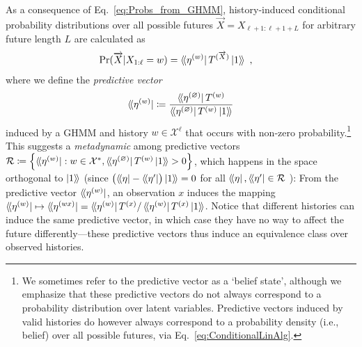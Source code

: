 \documentclass[prx,nofootinbib,onecolumn,showkeys,groupaddress,preprintnumbers,floatfix,
superscriptaddress]{revtex4-1}
\newcommand{\dbra}[1]{\bra{ \! \langle #1}}
\newcommand{\dket}[1]{\ket{ #1 \rangle \!}}
\newcommand{\init}{\dbra{\eta^{(\varnothing)}}}
\begin{document}
As a consequence of Eq.~\eqref{eq:Probs_from_GHMM}, 
history-induced
conditional probability distributions over 
all possible futures $\overrightarrow{X} = X_{\ell+1: \ell+1 + L}$
for arbitrary future length $L$
are calculated as 
\begin{align}
	\Pr(\overrightarrow{X} |X_{1:\ell} = w) 
 & = 
\dbra{\eta^{(w)}}
T^{(\overrightarrow{X})} \dket{1} 
\label{eq:ConditionalLinAlg}
 ~,
\end{align}
where we define 
the \emph{predictive vector}
\begin{align}
\dbra{\eta^{(w)}} \coloneqq \frac{\init T^{(w)}}{ \init T^{(w)} \dket{1}}
\end{align}
induced by a GHMM and history $w \in \mathcal{X}^{\ell}$ that occurs with non-zero probability.\footnote{We sometimes refer to the predictive vector as a `belief state', although we emphasize that these predictive vectors do not always correspond to a probability distribution over latent variables.  Predictive vectors induced by valid histories do however always correspond to a probability density (i.e., belief) over all possible futures, via Eq.~\eqref{eq:ConditionalLinAlg}.}
%
%
This suggests a \emph{metadynamic} among predictive vectors
 $\mathcal{R} \coloneqq \Bigl\{ 
 \dbra{ \eta^{(w)}} : w \in \mathcal{X}^*, 
 \init T^{(w)} \dket{1} > 0 \Bigr\}$,
 which happens in the space orthogonal to $\dket{1}$
 (since 
 $\bigl( \dbra{\eta} - \dbra{\eta'} \bigr) \dket{1} = 0$ for all $\dbra{\eta} ,  \dbra{\eta'} \in \mathcal{R}$ ):
 From the predictive vector $\dbra{\eta^{(w)}}$, an observation $x$ induces the mapping $\dbra{\eta^{(w)}} \mapsto \dbra{\eta^{(wx)}} = \dbra{\eta^{(w)}} T^{(x)} / \dbra{\eta^{(w)}} T^{(x)} \dket{1}$.
 Notice that different histories can induce the same predictive vector, in which case they have no way to affect the future differently---these predictive vectors thus induce an equivalence class over observed histories.
\end{document}
